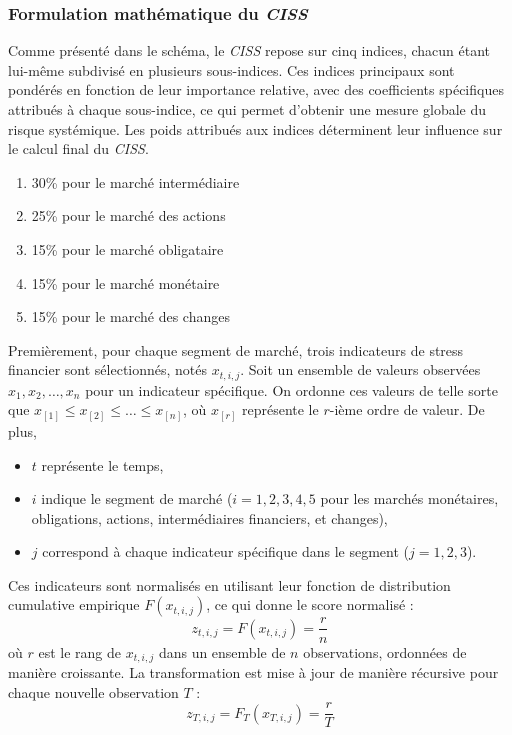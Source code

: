 \begin{sloppypar}


\subsubsection{Formulation mathématique du \textit{CISS}}


Comme présenté dans le schéma, le \textit{CISS} repose sur cinq indices, chacun étant lui-même subdivisé en plusieurs sous-indices. Ces indices principaux sont pondérés en fonction de leur importance relative, avec des coefficients spécifiques attribués à chaque sous-indice, ce qui permet d'obtenir une mesure globale du risque systémique. Les poids attribués aux indices déterminent leur influence sur le calcul final du \textit{CISS}.

\begin{enumerate}
    \item  30\% pour le marché intermédiaire
    \item 25\% pour le marché des actions 
    \item 15\% pour le marché obligataire 
    \item 15\% pour le marché monétaire
    \item 15\% pour le marché des changes
\end{enumerate}

Premièrement, pour chaque segment de marché, trois indicateurs de stress financier sont sélectionnés, notés \( x_{t,i,j} \). Soit un ensemble de valeurs observées \( x_1, x_2, \dots, x_n \) pour un indicateur spécifique. On ordonne ces valeurs de telle sorte que \( x_{[1]} \leq x_{[2]} \leq \dots \leq x_{[n]} \), où \( x_{[r]} \) représente le \( r \)-ième ordre de valeur. De plus,


\begin{itemize}
    \item \( t \) représente le temps,
    \item \( i \) indique le segment de marché (\( i = 1, 2, 3, 4, 5 \) pour les marchés monétaires, obligations, actions, intermédiaires financiers, et changes),
    \item \( j \) correspond à chaque indicateur spécifique dans le segment (\( j = 1, 2, 3 \)).
\end{itemize}

Ces indicateurs sont normalisés en utilisant leur fonction de distribution cumulative empirique \( F(x_{t,i,j}) \), ce qui donne le score normalisé :
\[
z_{t,i,j} = F(x_{t,i,j}) = \frac{r}{n}
\]
où \( r \) est le rang de \( x_{t,i,j} \) dans un ensemble de \( n \) observations, ordonnées de manière croissante. La transformation est mise à jour de manière récursive pour chaque nouvelle observation \( T \) :
\[
z_{T,i,j} = F_{T}(x_{T,i,j}) = \frac{r}{T}
\]


\end{sloppypar}
